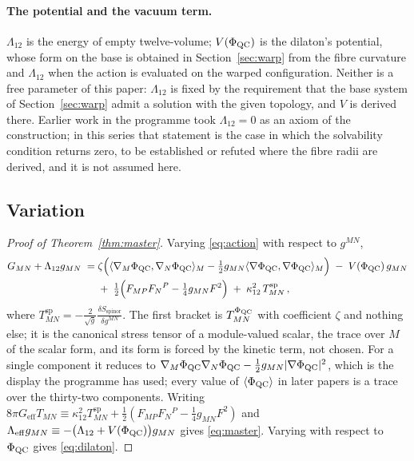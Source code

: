 \paragraph{The potential and the vacuum term.}
$\Lambda_{12}$ is the energy of empty twelve-volume; $V(\Phi_{\mathrm{QC}})$ is the
dilaton's potential, whose form on the base is obtained in Section~\ref{sec:warp} from
the fibre curvature and $\Lambda_{12}$ when the action is evaluated on the
warped configuration. Neither is a free parameter of this paper:
$\Lambda_{12}$ is fixed by the requirement that the base system of
Section~\ref{sec:warp} admit a solution with the given topology, and $V$ is derived
there. Earlier work in the programme took $\Lambda_{12}=0$ as an axiom of
the construction; in this series that statement is the case in which the
solvability condition returns zero, to be established or refuted where the
fibre radii are derived, and it is not assumed here. \rigD

\subsection{Variation}\label{sec:variation}

\begin{proof}[Proof of Theorem~\ref{thm:master}]
Varying \eqref{eq:action} with respect to $g^{MN}$,
\begin{equation}\label{eq:var}
\begin{aligned}
  G_{MN}+\Lambda_{12}g_{MN}
  \;=\;&\zeta\Bigl(\langle\nabla_{M}\Phi_{\mathrm{QC}},\nabla_{N}\Phi_{\mathrm{QC}}\rangle_{M}-\tfrac12 g_{MN}\langle\nabla\Phi_{\mathrm{QC}},\nabla\Phi_{\mathrm{QC}}\rangle_{M}\Bigr)
  \;-\;V(\Phi_{\mathrm{QC}})\,g_{MN}\\
  &+\;\tfrac12\Bigl(F_{MP}F_{N}{}^{P}-\tfrac14 g_{MN}F^{2}\Bigr)
  \;+\;\kappa_{12}^{2}\,T^{\mathrm{sp}}_{MN}\,,
\end{aligned}
\end{equation}
where $T^{\mathrm{sp}}_{MN}=-\frac{2}{\sqrt g}\frac{\delta S_{\mathrm{spinor}}}{\delta g^{MN}}$.
The first bracket is $T^{\Phi_{\mathrm{QC}}}_{MN}$ with coefficient $\zeta$ and nothing
else; it is the canonical stress tensor of a module-valued scalar, the
trace over $M$ of the scalar form, and its form is forced by the kinetic
term, not chosen. For a single component it reduces to
$\nabla_{M}\Phi_{\mathrm{QC}}\nabla_{N}\Phi_{\mathrm{QC}}-\tfrac12g_{MN}\lvert\nabla\Phi_{\mathrm{QC}}\rvert^{2}$, which is
the display the programme has used; every value of $\langle\Phi_{\mathrm{QC}}\rangle$ in
later papers is a trace over the thirty-two components. Writing
$8\pi G_{\mathrm{eff}}T_{MN}\equiv\kappa_{12}^{2}T^{\mathrm{sp}}_{MN}+\tfrac12(F_{MP}F_{N}{}^{P}-\tfrac14g_{MN}F^{2})$
and $\Lambda_{\mathrm{eff}}g_{MN}\equiv-\bigl(\Lambda_{12}+V(\Phi_{\mathrm{QC}})\bigr)g_{MN}$
gives \eqref{eq:master}. Varying with respect to $\Phi_{\mathrm{QC}}$ gives
\eqref{eq:dilaton}. \rigR
\end{proof}

